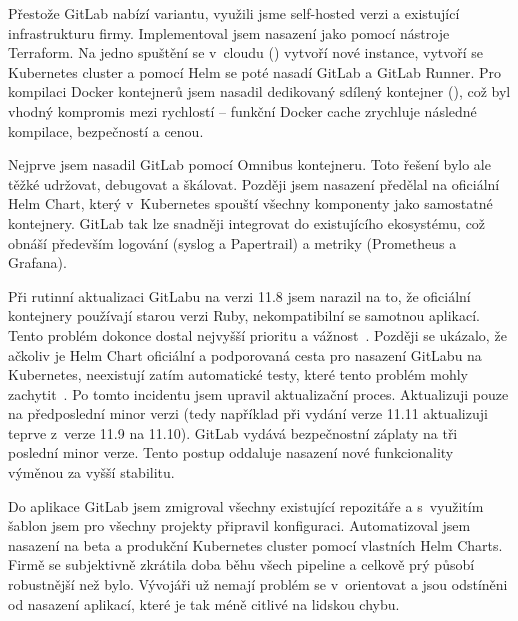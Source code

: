     Přestože GitLab nabízí  variantu, využili jsme self-hosted verzi a existující infrastrukturu firmy. Implementoval jsem nasazení jako  pomocí nástroje Terraform. Na jedno spuštění se v~cloudu () vytvoří nové instance, vytvoří se Kubernetes cluster a pomocí Helm se poté nasadí GitLab a GitLab Runner. Pro kompilaci Docker kontejnerů jsem nasadil dedikovaný sdílený kontejner (), což byl vhodný kompromis mezi rychlostí -- funkční Docker cache zrychluje následné kompilace, bezpečností a cenou.

    Nejprve jsem nasadil GitLab pomocí Omnibus kontejneru. Toto řešení bylo ale těžké udržovat, debugovat a škálovat. Později jsem nasazení předělal na oficiální Helm Chart, který v~Kubernetes spouští všechny komponenty jako samostatné kontejnery. GitLab tak lze snadněji integrovat do existujícího ekosystému, což obnáší především logování (syslog a Papertrail) a metriky (Prometheus a Grafana).

    Při rutinní aktualizaci GitLabu na verzi 11.8 jsem narazil na to, že oficiální kontejnery používají starou verzi Ruby, nekompatibilní se samotnou aplikací. Tento problém dokonce dostal nejvyšší prioritu a vážnost~\cite{gitlab-issue-chart}. Později se ukázalo, že ačkoliv je Helm Chart oficiální a podporovaná cesta pro nasazení GitLabu na Kubernetes, neexistují zatím automatické testy, které tento problém mohly zachytit~\cite{gitlab-issue-qa}. Po tomto incidentu jsem upravil aktualizační proces. Aktualizuji pouze na předposlední minor verzi (tedy například při vydání verze 11.11 aktualizuji teprve z~verze 11.9 na 11.10). GitLab vydává bezpečnostní záplaty na tři poslední minor verze. Tento postup oddaluje nasazení nové funkcionality výměnou za vyšší stabilitu.

    Do aplikace GitLab jsem zmigroval všechny existující repozitáře a s~využitím šablon jsem pro všechny projekty připravil \CI konfiguraci. Automatizoval jsem nasazení na beta a produkční Kubernetes cluster pomocí vlastních Helm Charts. Firmě se subjektivně zkrátila doba běhu všech pipeline a celkově prý působí \CI robustnější než bylo. Vývojáři už nemají problém se v~\CI orientovat a jsou odstíněni od nasazení aplikací, které je tak méně citlivé na lidskou chybu.
